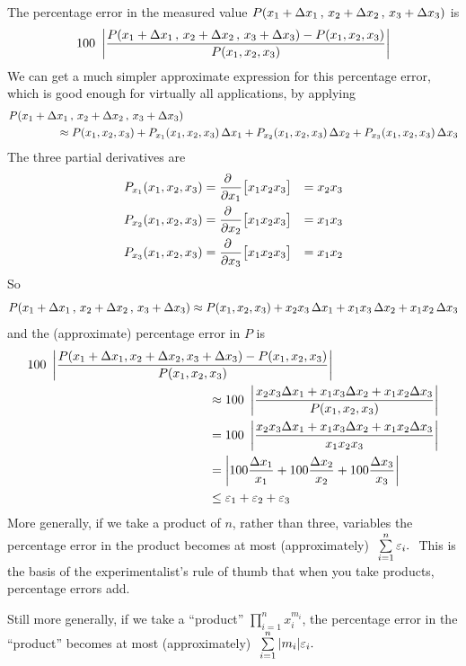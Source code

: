 \begin{eg}
The percentage error in the measured value  
$P(x_1+\Delta x_1\,,\,x_2+\Delta x_2\,,\,x_3+\Delta x_3)$ is
\begin{equation*}
100\ \left|\frac{P(x_1+\Delta x_1\,,\,x_2+\Delta x_2\,,\,x_3+\Delta x_3)-P(x_1,x_2,x_3)}
               {P(x_1,x_2,x_3)}\right|
\end{equation*}
We can get a much simpler approximate expression for this percentage error,
which is good enough for virtually all applications, by applying
\begin{align*}
P(x_1+\Delta &x_1\,,\,x_2+\Delta x_2\,,\,x_3+\Delta x_3) \\
&\approx P(x_1,x_2,x_3) +P_{x_1}(x_1,x_2,x_3)\,\Delta x_1
+P_{x_2}(x_1,x_2,x_3)\,\Delta x_2+P_{x_3}(x_1,x_2,x_3)\,\Delta x_3
\end{align*}
The three partial derivatives are
\begin{alignat*}{3}
P_{x_1}(x_1,x_2,x_3)&=\pdiff{}{x_1}\big[x_1x_2x_3\big]
&=x_2x_3\cr
P_{x_2}(x_1,x_2,x_3)&=\pdiff{}{x_2}\big[x_1x_2x_3\big]
&=x_1x_3\cr
P_{x_3}(x_1,x_2,x_3)&=\pdiff{}{x_3}\big[x_1x_2x_3\big]
&=x_1x_2
\end{alignat*}
So 
\begin{equation*}
P(x_1+\Delta x_1\,,\,x_2+\Delta x_2\,,\,x_3+\Delta x_3)
\approx P(x_1,x_2,x_3) +x_2x_3\,\Delta x_1+x_1x_3\,\Delta x_2+x_1x_2\,\Delta x_3
\end{equation*}
and the (approximate) percentage error in $P$ is
\begin{align*}
&100\ \left|
  \frac{P(x_1+\De x_1,x_2+\De x_2,x_3+\De x_3)-P(x_1,x_2,x_3)}{P(x_1,x_2,x_3)}
   \right|
\\
&\hskip2in\approx 
       100\ \left|
         \frac{x_2x_3\De x_1+x_1x_3\De x_2+x_1x_2\De x_3}{P(x_1,x_2,x_3)}
       \right| \\
&\hskip2in=100\ 
  \left|\frac{x_2x_3\De x_1+x_1x_3\De x_2+x_1x_2\De x_3}{x_1x_2x_3}\right| \\
&\hskip2in=\left|100\frac{\De x_1}{x_1}+100\frac{\De x_2}{x_2}
         +100\frac{\De x_3}{x_3}\right| \\
&\hskip2in\le \veps_1+\veps_2+\veps_3
\end{align*}
More generally, if we take a product of $n$, rather than three,  variables
the percentage error in the product becomes at most (approximately)
$\ 
\smsum\limits_{i=1}^n\veps_i.
\ $
This is the basis of the experimentalist's rule of thumb that when you
take products, percentage errors add.

Still more generally, if we take a ``product'' 
  $\prod_{i=1}^n x_i^{m_i}$, the percentage error in the ``product'' becomes at most (approximately)
$\ 
\smsum\limits_{i=1}^n|m_i|\veps_i.
\ $


\end{eg}


